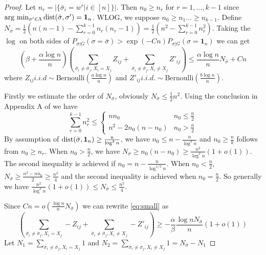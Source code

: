 \documentclass{article}
\begin{document}
\begin{proof}
	Let $n_r = |\{\bar{\sigma}_i = w^r | i\in [n] \}|$. Then $n_0 \geq n_r$ for $r=1, \dots, k-1$ since  $\arg\,\min_{\sigma'\in \Lambda} \operatorname{dist}(\bar{\sigma}, \sigma') = \mathbf{1}_n$.
	WLOG, we suppose $n_0 \geq n_1 \dots \geq n_{k-1}$.
	Define $N_{\bar{\sigma}} = \frac{1}{2}(n(n-1) - \sum_{r=0}^{k-1} n_r(n_r-1))
	=\frac{1}{2}(n^2 - \sum_{r=0}^{k-1} n_r^2)$.
	Taking the $\log$ on both sides of $P_{\sigma | G}(\sigma = \bar{\sigma} ) > \exp(-Cn) P_{\sigma | G}(\sigma = \mathbf{1}_n)$ we can get
	\begin{equation}\label{eq:small}
	(\beta + \frac{\alpha \log n}{n})
	\left( \sum_{\bar{\sigma}_i  \neq \bar{\sigma}_j, X_i = X_j} Z_{ij} + \sum_{\bar{\sigma}_i  \neq \bar{\sigma}_j, X_i \neq X_j} Z'_{ij} \right)
	\leq \frac{\alpha \log n}{n} N_{\bar{\sigma}} + C n
	\end{equation}
	where $Z_{ij} i.i.d \sim \textrm{Bernoulli}(\frac{a\log n}{n})$ and $Z'_{ij} i.i.d. \sim \textrm{Bernoulli}(\frac{b \log n}{n})$.
	
	Firstly we estimate the order of $N_{\bar{\sigma}}$, obviously $N_{\bar{\sigma}} \leq \frac{1}{2} n^2$.
	Using the conclusion in Appendix A of \cite{chen2016information} we have
	\begin{equation}
	\sum_{r=0}^{k-1} n_r^2 \leq
	\begin{cases}
	n n_0 & n_0 \leq \frac{n}{2} \\
	n^2 - 2n_0(n-n_0) & n_0 > \frac{n}{2}
	\end{cases}
	\end{equation}
	By assumption of $\operatorname{dist}(\bar{\sigma}, \mathbf{1}_n) \geq \frac{n}{\log^{\delta} n}$, we have $n_0 \leq n - \frac{n}{\log^{\delta} n}$
	and $n_0 \geq \frac{n}{k}$ follows from $n_0 \geq n_r$.
	When $n_0 > \frac{n}{2}$,
	we have $N_{\bar{\sigma}} \geq n_0 (n - n_0) \geq \frac{n^2}{\log^{\delta} n}(1+o(1))$.
	The second inequality is achieved if $n_0 = n - \frac{n}{\log^{1/3} n}$.
	When $n_0 < \frac{n}{2}$,
	$N_{\bar{\sigma}} \geq \frac{n^2 - nn_0}{2} \geq \frac{n^2}{4}$ and the second inequality is achieved when $n_0 = \frac{n}{2}$.
	So generally we have $\frac{n^2}{\log^{\delta} n}(1+o(1)) \leq N_{\bar{\sigma}} \leq \frac{n^2}{4}$.
	
	Since $Cn = o(\frac{\log n}{n} N_{\bar{\sigma}})$ we can rewrite \eqref{eq:small} as
	\begin{equation}
	\left( \sum_{\bar{\sigma}_i  \neq \bar{\sigma}_j, X_i = X_j} -Z_{ij} + \sum_{\bar{\sigma}_i  \neq \bar{\sigma}_j, X_i \neq X_j} -Z'_{ij} \right)\geq -\frac{\alpha}{\beta}\frac{\log n N_{\bar{\sigma}}}{n}(1+o(1))
	\end{equation}
	Let $N_1 = \sum_{\bar{\sigma}_i  \neq \bar{\sigma}_j, X_i = X_j} 1$
	and $N_2 = \sum_{\bar{\sigma}_i  \neq \bar{\sigma}_j, X_i \neq X_j} 1 = N_{\bar{\sigma}} - N_1$
	

\end{proof}
\end{document}
